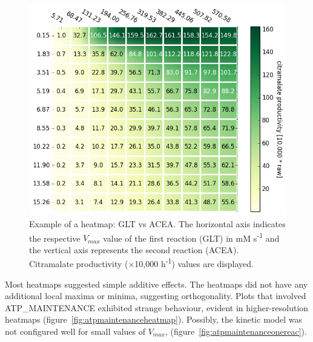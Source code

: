 \documentclass[parskip=full, numbers=noenddot]{scrreprt}
\begin{document}
\begin{figure}[h]
  \centering
  \includegraphics[scale=0.5]{heatmapsample}
  \caption{Example of a heatmap: GLT vs ACEA. The horizontal axis indicates the respective $V_{max}$ value of the first reaction (GLT) in mM s\textsuperscript{-1} and the vertical axis represents the second reaction (ACEA). Citramalate productivity ($\times${}10,000 h\textsuperscript{-1}) values are displayed.}
  \label{fig:heatmapsample}
\end{figure}

Most heatmaps suggested simple additive effects. The heatmaps did not have any additional local maxima or minima, suggesting orthogonality. Plots that involved ATP\_MAIN\-TEN\-ANCE exhibited strange behaviour, evident in higher-resolution heatmaps (figure~\ref{fig:atpmaintenanceheatmap}). Possibly, the kinetic model was not configured well for small values of $V_{max}$, (figure~\ref{fig:atpmaintenanceonereac}).
\end{document}
